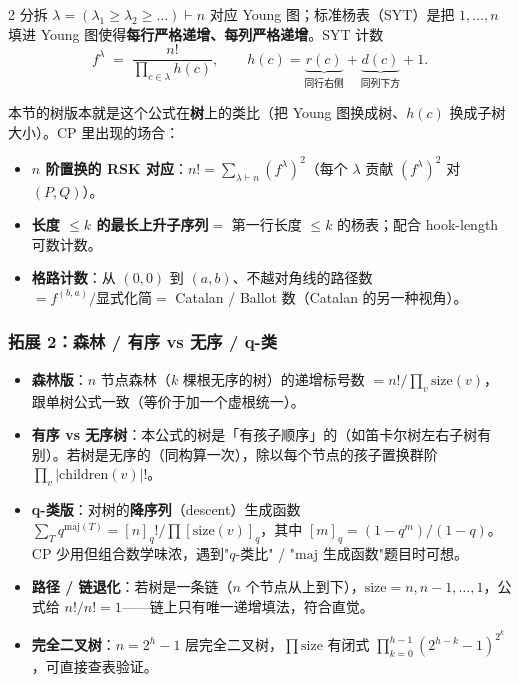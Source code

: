 \begin{multicols*}{2}
		分拆 $\lambda = (\lambda_1 \ge \lambda_2 \ge \dots) \vdash n$ 对应 Young 图；标准杨表（SYT）是把 $1, \dots, n$ 填进 Young 图使得\textbf{每行严格递增、每列严格递增}。SYT 计数
		\[
			f^\lambda \;=\; \frac{n!}{\displaystyle\prod_{c \in \lambda} h(c)}, \qquad h(c) = \underbrace{r(c)}_{\text{同行右侧}} + \underbrace{d(c)}_{\text{同列下方}} + 1.
		\]

		本节的树版本就是这个公式在\textbf{树}上的类比（把 Young 图换成树、$h(c)$ 换成子树大小）。CP 里出现的场合：
		\begin{itemize}
			\item \textbf{$n$ 阶置换的 RSK 对应}：$n! = \sum_{\lambda \vdash n} (f^\lambda)^2$（每个 $\lambda$ 贡献 $(f^\lambda)^2$ 对 $(P, Q)$）。
			\item \textbf{长度 $\le k$ 的最长上升子序列}$= $ 第一行长度 $\le k$ 的杨表；配合 hook-length 可数计数。
			\item \textbf{格路计数}：从 $(0,0)$ 到 $(a, b)$、不越对角线的路径数 $= f^{(b, a)} / \text{显式化简} = $ Catalan / Ballot 数（Catalan 的另一种视角）。
		\end{itemize}

		\subsubsection*{拓展 2：森林 / 有序 vs 无序 / q-类}

		\begin{itemize}
			\item \textbf{森林版}：$n$ 节点森林（$k$ 棵根无序的树）的递增标号数 $= n! / \prod_v \mathrm{size}(v)$，跟单树公式一致（等价于加一个虚根统一）。
			\item \textbf{有序 vs 无序树}：本公式的树是「有孩子顺序」的（如笛卡尔树左右子树有别）。若树是无序的（同构算一次），除以每个节点的孩子置换群阶 $\prod_v |\mathrm{children}(v)|!$。
			\item \textbf{q-类版}：对树的\textbf{降序列}（descent）生成函数 $\sum_T q^{\mathrm{maj}(T)} = [n]_q! / \prod [\mathrm{size}(v)]_q$，其中 $[m]_q = (1 - q^m)/(1 - q)$。CP 少用但组合数学味浓，遇到"$q$-类比" / "$\mathrm{maj}$ 生成函数"题目时可想。
			\item \textbf{路径 / 链退化}：若树是一条链（$n$ 个节点从上到下），$\mathrm{size} = n, n-1, \dots, 1$，公式给 $n!/n! = 1$——链上只有唯一递增填法，符合直觉。
			\item \textbf{完全二叉树}：$n = 2^h - 1$ 层完全二叉树，$\prod \mathrm{size}$ 有闭式 $\prod_{k=0}^{h-1} (2^{h-k} - 1)^{2^k}$，可直接查表验证。
		\end{itemize}


\end{multicols*}
